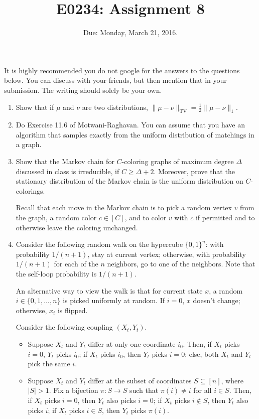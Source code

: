 \documentclass[11pt]{article}
\begin{document}
\def\Exp{\mathbf{Exp}}
\def\Var{\mathbf{Var}}
\title{E0234: Assignment 8}
\author{}
\date{Due: Monday, March 21, 2016.}
\maketitle
It is highly recommended you do not google for the answers to the questions below. You can discuss with your friends, but then mention that in your submission.
The writing should solely be your own.

\begin{enumerate}
\item 
Show that if $\mu$ and $\nu$ are two distributions, $\|\mu-\nu\|_{\text{TV}} = \frac{1}{2} \|\mu - \nu\|_1$. 


\item
Do Exercise 11.6 of Motwani-Raghavan. You can assume that you have an algorithm that samples exactly from the uniform distribution of matchings in a graph. 

\item
Show that the Markov chain for $C$-coloring graphs of maximum degree $\Delta$ discussed in class is irreducible, if $C \geq \Delta + 2$. Moreover, prove that the stationary distribution of the Markov chain is the uniform distribution on $C$-colorings.

Recall that each move in the Markov chain is to pick a random vertex $v$ from the graph, a random color $c \in [C]$, and to color $v$ with $c$ if permitted and to otherwise leave the coloring unchanged.


\item
Consider the following random walk on the hypercube $\{0,1\}^n$: with probability $1/(n+1)$, stay at current vertex; otherwise, with probability $1/(n+1)$ for each of the $n$ neighbors, go to one of the neighbors. Note that the self-loop probability is $1/(n+1)$.  

An alternative way to view the walk is that for current state $x$,  a random $i \in \{0,1, \dots, n\}$ is picked uniformly at random. If $i=0$, $x$ doesn't change; otherwise, $x_i$ is flipped.

Consider the following coupling $(X_t, Y_t)$.
\begin{itemize}
\item
  Suppose $X_t$ and $Y_t$ differ at only one coordinate $i_0$. Then, if $X_t$ picks $i=0$, $Y_t$ picks $i_0$; if $X_t$ picks $i_0$, then $Y_t$ picks $i=0$; else, both $X_t$ and $Y_t$ pick the same $i$.

\item
Suppose $X_t$ and $Y_t$ differ at the subset of coordinates $S \subseteq [n]$, where $|S| > 1$. Fix a bijection $\pi: S \to S$ such that $\pi(i) \neq i$ for all $i \in S$. Then, if $X_t$ picks $i=0$, then $Y_t$ also picks $i=0$; if $X_t$ picks $i \not \in S$, then $Y_t$ also picks $i$; if $X_t$ picks $i \in S$, then $Y_t$ picks $\pi(i)$.
\end{itemize}


\end{enumerate}
\end{document}
